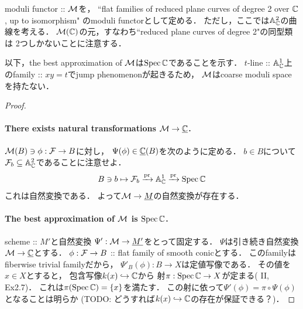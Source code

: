 \documentclass[a4paper]{jsarticle}
\begin{document}
    \begin{Example}
        moduli functor :: $\mathcal{M}$を，
        ``flat families of reduced plane curves of degree 2 over $\mathbb{C}$, up to isomorphism"
        のmoduli functorとして定める．
        ただし，ここでは$\mathbb{A}_{\mathbb{C}}^2$の曲線を考える．
        $\mathcal{M}(\mathbb{C})$の元，すなわち``reduced plane curves of degree 2"の同型類は
        2つしかないことに注意する．

        以下，the best approximation of $\mathcal{M}$は$\operatorname{Spec} \mathbb{C}$であることを示す．
        $t$-line :: $\mathbb{A}_{\mathbb{C}}^1$上のfamily :: $xy=t$でjump phenomenonが起きるため，
        $\mathcal{M}$はcoarse moduli spaceを持たない．

        \begin{proof}
        \paragraph{There exists natural transformations $\mathcal{M} \to \underline{\mathbb{C}}$.}
        $\mathcal{M}(B) \ni \phi: \mathcal{F} \to B$に対し，
        $\Psi(\phi) \in \underline{\mathbb{C}}(B)$を次のように定める．
        $b \in B$について$\mathcal{F}_b \subseteq \mathbb{A}^2_{\mathbb{C}}$であることに注意せよ．
        \[ B \ni b \mapsto \mathcal{F}_b \xrightarrow{\operatorname{pr}} \mathbb{A}^1_{\mathbb{C}} \xrightarrow{\operatorname{pr}} \operatorname{Spec} \mathbb{C} \]
        これは自然変換である．
        よって$\mathcal{M} \to \underline{M}$の自然変換が存在する．

        \paragraph{The best approximation of $\mathcal{M}$ is $\operatorname{Spec} \mathbb{C}$.}
        scheme :: $M'$と自然変換
        $\Psi': \mathcal{M} \to \underline{M'}$をとって固定する．
        $\Psi$は引き続き自然変換$\mathcal{M} \to \underline{\mathbb{C}}$とする．
        $\phi: \mathcal{F} \to B$ :: flat family of smooth conicとする．
        このfamilyはfiberwise trivial familyだから，
        $\Psi'_B(\phi): B \to X$は定値写像である．
        その値を$x \in X$とすると，
        包含写像$k(x) \hookrightarrow \mathbb{C}$から
        射$\pi: \operatorname{Spec} \mathbb{C} \to X$が定まる(\cite{HarAG} II, Ex2.7)．
        これは$\pi(\operatorname{Spec} \mathbb{C})=\{ x \}$を満たす．
        この射に依って$\Psi'(\phi)=\pi \circ \Psi(\phi)$となることは明らか
        (TODO: どうすれば$k(x) \hookrightarrow \mathbb{C}$の存在が保証できる？)．
        \end{proof}
    \end{Example}

\end{document}
